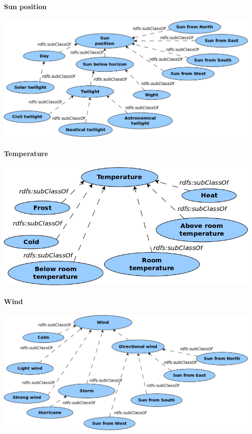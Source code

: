 \paragraph{Sun position}

\begin{center}
  \includegraphics[scale=.3]{figures/diagrams/sun-position.png}
\end{center}

\paragraph{Temperature}

\begin{center}
  \includegraphics[scale=.3]{figures/diagrams/temperature.png}
\end{center}

\paragraph{Wind}

\begin{center}
  \includegraphics[scale=.3]{figures/diagrams/wind.png}
\end{center}

